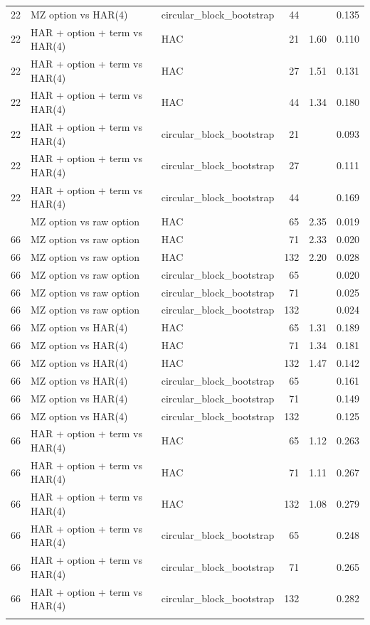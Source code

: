 \begin{tabular}{rllrrr}
22 & MZ option vs HAR(4) & circular_block_bootstrap & 44 &  & 0.135 \\
22 & HAR + option + term vs HAR(4) & HAC & 21 & 1.60 & 0.110 \\
22 & HAR + option + term vs HAR(4) & HAC & 27 & 1.51 & 0.131 \\
22 & HAR + option + term vs HAR(4) & HAC & 44 & 1.34 & 0.180 \\
22 & HAR + option + term vs HAR(4) & circular_block_bootstrap & 21 &  & 0.093 \\
22 & HAR + option + term vs HAR(4) & circular_block_bootstrap & 27 &  & 0.111 \\
22 & HAR + option + term vs HAR(4) & circular_block_bootstrap & 44 &  & 0.169 \\
\addlinespace
66 & MZ option vs raw option & HAC & 65 & 2.35 & 0.019 \\
66 & MZ option vs raw option & HAC & 71 & 2.33 & 0.020 \\
66 & MZ option vs raw option & HAC & 132 & 2.20 & 0.028 \\
66 & MZ option vs raw option & circular_block_bootstrap & 65 &  & 0.020 \\
66 & MZ option vs raw option & circular_block_bootstrap & 71 &  & 0.025 \\
66 & MZ option vs raw option & circular_block_bootstrap & 132 &  & 0.024 \\
66 & MZ option vs HAR(4) & HAC & 65 & 1.31 & 0.189 \\
66 & MZ option vs HAR(4) & HAC & 71 & 1.34 & 0.181 \\
66 & MZ option vs HAR(4) & HAC & 132 & 1.47 & 0.142 \\
66 & MZ option vs HAR(4) & circular_block_bootstrap & 65 &  & 0.161 \\
66 & MZ option vs HAR(4) & circular_block_bootstrap & 71 &  & 0.149 \\
66 & MZ option vs HAR(4) & circular_block_bootstrap & 132 &  & 0.125 \\
66 & HAR + option + term vs HAR(4) & HAC & 65 & 1.12 & 0.263 \\
66 & HAR + option + term vs HAR(4) & HAC & 71 & 1.11 & 0.267 \\
66 & HAR + option + term vs HAR(4) & HAC & 132 & 1.08 & 0.279 \\
66 & HAR + option + term vs HAR(4) & circular_block_bootstrap & 65 &  & 0.248 \\
66 & HAR + option + term vs HAR(4) & circular_block_bootstrap & 71 &  & 0.265 \\
66 & HAR + option + term vs HAR(4) & circular_block_bootstrap & 132 &  & 0.282 \\
\addlinespace
\bottomrule
\end{tabular}
